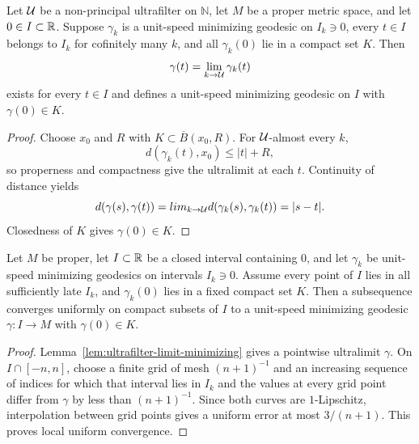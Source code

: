 \begin{lemma}
\label{lem:ultrafilter-limit-minimizing}






Let $\mathcal{U}$ be a non-principal ultrafilter on $\mathbb N$, let $M$ be a
proper metric space, and let $0\in I\subset\mathbb{R}$. Suppose $\gamma_k$ is a
unit-speed minimizing geodesic on $I_k\ni0$, every $t\in I$ belongs to
$I_k$ for cofinitely many $k$, and all $\gamma_k(0)$ lie in a compact set
$K$. Then
$$\gamma(t)=\lim_{k\to\mathcal{U}}\gamma_k(t)$$
exists for every $t\in I$ and defines a unit-speed minimizing geodesic on
$I$ with $\gamma(0)\in K$.
\end{lemma}
\begin{proof}
\sketch

Choose $x_0$ and $R$ with $K\subset\overline B(x_0,R)$. For
$\mathcal{U}$-almost every $k$,
$$d(\gamma_k(t),x_0)\le |t|+R,$$
so properness and compactness give the ultralimit at each $t$. Continuity
of distance yields
$$d(\gamma(s),\gamma(t))=lim_{k\to\mathcal{U}}d(\gamma_k(s),\gamma_k(t))
=|s-t|.$$
Closedness of $K$ gives $\gamma(0)\in K$.
\end{proof}

\begin{lemma}
\label{lem:metric-limit-of-minimizing}






Let $M$ be proper, let $I\subset\mathbb{R}$ be a closed interval containing
$0$, and let $\gamma_k$ be unit-speed minimizing geodesics on intervals
$I_k\ni0$. Assume every point of $I$ lies in all sufficiently late
$I_k$, and $\gamma_k(0)$ lies in a fixed compact set $K$. Then a
subsequence converges uniformly on compact subsets of $I$ to a unit-speed
minimizing geodesic $\gamma\colon I\to M$ with $\gamma(0)\in K$.
\end{lemma}
\begin{proof}
\sketch

Lemma~\ref{lem:ultrafilter-limit-minimizing} gives a pointwise ultralimit
$\gamma$. On $I\cap[-n,n]$, choose a finite grid of mesh $(n+1)^{-1}$
and an increasing sequence of indices for which that interval lies in
$I_k$ and the values at every grid point differ from $\gamma$ by less
than $(n+1)^{-1}$. Since both curves are $1$-Lipschitz, interpolation
between grid points gives a uniform error at most $3/(n+1)$. This proves
local uniform convergence.
\end{proof}

